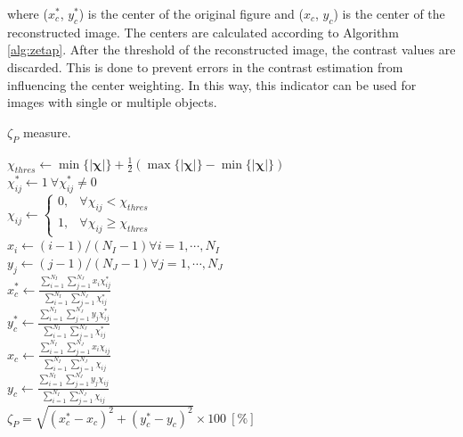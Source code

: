 			\noindent where ($x^*_c$, $y^*_c$) is the center of the original figure and ($x_c$, $y_c$) is the center of the reconstructed image. The centers are calculated according to Algorithm \ref{alg:zetap}. After the threshold of the reconstructed image, the contrast values are discarded. This is done to prevent errors in the contrast estimation from influencing the center weighting. In this way, this indicator can be used for images with single or multiple objects.
			\begin{algorithm}[!htb]
				\caption{$\zeta_P$ measure.}
				\label{alg:zetap}
				\KwIn{$\boldsymbol{\chi^{*}}$, $\boldsymbol{\chi}$}
				$\chi_{thres} \leftarrow \min\{|\boldsymbol{\chi}|\} + \frac{1}{2}\left(\max\{|\boldsymbol{\chi}|\}-\min\{|\boldsymbol{\chi}|\}\right)$\\
				$\chi^{*}_{ij}\leftarrow1~\forall\chi^{*}_{ij}\neq0$\\
				$\chi_{ij}\leftarrow\begin{cases} 0, &\forall\chi_{ij}<\chi_{thres} \\ 1, &\forall\chi_{ij}\ge\chi_{thres}\end{cases}$ \\
				$x_i \leftarrow (i-1)/(N_I-1) \forall i = 1, \cdots, N_I$\\
				$y_j \leftarrow (j-1)/(N_J-1) \forall j = 1, \cdots, N_J$\\
				$x^*_c\leftarrow \frac{\sum_{i=1}^{N_I}\sum_{j=1}^{N_J} x_i\chi^*_{ij}}{\sum_{i=1}^{N_I}\sum_{j=1}^{N_J}\chi^*_{ij}}$ \\
				$y^*_c\leftarrow \frac{\sum_{i=1}^{N_I}\sum_{j=1}^{N_J} y_j\chi^*_{ij}}{\sum_{i=1}^{N_I}\sum_{j=1}^{N_J}\chi^*_{ij}}$ \\
				$x_c\leftarrow \frac{\sum_{i=1}^{N_I}\sum_{j=1}^{N_J} x_i\chi_{ij}}{\sum_{i=1}^{N_I}\sum_{j=1}^{N_J}\chi_{ij}}$ \\
				$y_c\leftarrow \frac{\sum_{i=1}^{N_I}\sum_{j=1}^{N_J} y_j\chi_{ij}}{\sum_{i=1}^{N_I}\sum_{j=1}^{N_J}\chi_{ij}}$ \\
				$\zeta_P  = \sqrt{(x^*_c-x_c)^2 + (y^*_c-y_c)^2}\times 100~[\%]$
			\end{algorithm}
			

